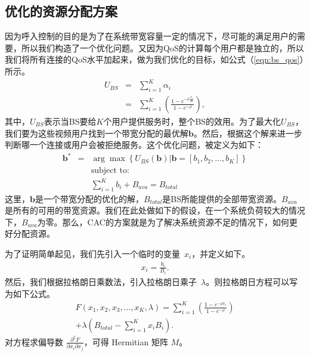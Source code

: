 \subsection{优化的资源分配方案}
因为呼入控制的目的是为了在系统带宽容量一定的情况下，尽可能的满足用户的需要，所以我们构造了一个优化问题。又因为QoS的计算每个用户都是独立的，所以我们将所有连接的QoS水平加起来，做为我们优化的目标，如公式（\ref{eqn:bs_qos}）所示。
\begin{eqnarray}
U_{BS} &=& \displaystyle \sum_{i=1}^K \alpha_i \nonumber \\
&=&\displaystyle \sum_{i=1}^K \left( \frac{1- e^{-\rho
\frac{b_i}{B_i} }}{1-e^{-\rho}} \right) ,\label{eqn:bs_qos}
\end{eqnarray}
其中，$U_{BS}$表示当BS要给$K$个用户提供服务时，整个BS的效用。为了最大化$U_{BS}$，我们要为这些视频用户找到一个带宽分配的最优解$\mathbf{b}$。然后，根据这个解来进一步判断哪一个连接或用户会被拒绝服务。这个优化问题，被定义为如下：
\begin{eqnarray}{}
\mathbf{b}^* &=& \arg \max \left\{ U_{BS}(\mathbf{b}) \big| \mathbf{b} = [b_1, b_2, \dots, b_K] \right\} \label{eqn_u_bs_qos}\\
& &\text{subject to:}\nonumber\\
& &\displaystyle\sum_{i=1}^{K}b_i + B_{ava}= B_{total} \nonumber
\end{eqnarray}
这里，$\mathbf{b}$是一个带宽分配的优化的解，$B_{total}$是BS所能提供的全部带宽资源。$B_{ava}$是所有的可用的带宽资源。我们在此处做如下的假设，在一个系统负荷较大的情况下，$B_{ava}$为零。那么，CAC的方案就是为了解决系统资源不足的情况下，如何更好分配资源。
%
\vspace{3mm}

\proof
为了证明简单起见，我们先引入一个临时的变量~$x_i$，并定义如下。
\begin{equation*}
\begin{split}
x_i = \frac{b_i}{B_i}.
\end{split}
\end{equation*}
%
然后，我们根据拉格朗日乘数法，引入拉格朗日乘子~$\lambda$。则拉格朗日方程可以写为如下公式。
\begin{equation}
\begin{split}
F (x_1, x_2, x_3, \dots, x_K, \lambda) = \sum^K_{i=1}
\left( \frac{1-e^{-\rho x_i}}{1-e^{-\rho}} \right) \\+ \lambda
\left(B_{total} - \sum^K_{i=1} x_i B_i \right).
\end{split}
\end{equation}
对方程求偏导数 $\frac{\partial ^2F}{\partial x_i \partial x_j}$，可得 Hermitian 矩阵 $M$。

